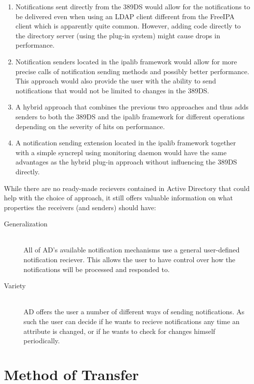 \begin{enumerate}
    \item Notifications sent directly from the 389DS would allow for the notifications to be delivered even when using an LDAP client different from the FreeIPA client which is apparently quite common.
    However, adding code directly to the directory server (using the plug-in system) might cause drops in performance.
    \item Notification senders located in the ipalib framework would allow for more precise calls of notification sending methods and possibly better performance.
    This approach would also provide the user with the ability to send notifications that would not be limited to changes in the 389DS.
    \item A hybrid approach that combines the previous two approaches and thus adds senders to both the 389DS and the ipalib framework for different operations depending on the severity of hits on performance.
    \item A notification sending extension located in the ipalib framework together with a simple syncrepl using monitoring daemon would have the same advantages as the hybrid plug-in approach without influencing
    the 389DS directly.
\end{enumerate}
\clearpage

While there are no ready-made recievers contained in Active Directory that could help with the choice of approach, it still offers valuable information on what properties the receivers (and senders) should have:

\begin{description}
    \item[Generalization]\hfill \\
        All of AD's available notification mechanisms use a general user-defined notification reciever.
        This allows the user to have control over how the notifications will be processed and responded to.
    \item[Variety]\hfill \\
        AD offers the user a number of different ways of sending notifications. As such the user can decide if he wants to recieve notifications any time an attribute is changed,
        or if he wants to check for changes himself periodically.
\end{description}

\section{Method of Transfer}

